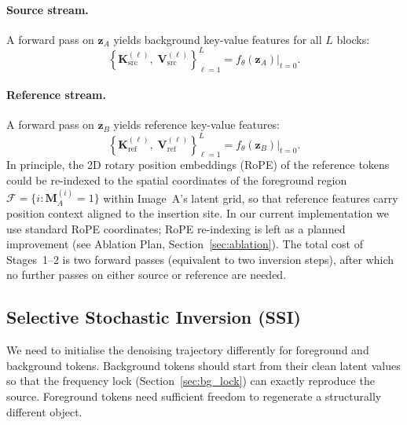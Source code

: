 \paragraph{Source stream.}
A forward pass on $\mathbf{z}_A$ yields background key-value features for all $L$ blocks:
\begin{equation}
    \left\{
        \mathbf{K}_{\mathrm{src}}^{(\ell)},\;
        \mathbf{V}_{\mathrm{src}}^{(\ell)}
    \right\}_{\ell=1}^{L}
    = f_\theta(\mathbf{z}_A)\big|_{t=0}.
    \label{eq:src_feat}
\end{equation}

\paragraph{Reference stream.}
A forward pass on $\mathbf{z}_B$ yields reference key-value features:
\begin{equation}
    \left\{
        \mathbf{K}_{\mathrm{ref}}^{(\ell)},\;
        \mathbf{V}_{\mathrm{ref}}^{(\ell)}
    \right\}_{\ell=1}^{L}
    = f_\theta(\mathbf{z}_B)\big|_{t=0}.
    \label{eq:ref_feat}
\end{equation}
In principle, the 2D rotary position embeddings (RoPE) of the reference tokens could be
re-indexed to the spatial coordinates of the foreground region
$\mathcal{F} = \{i : \mathbf{M}_A^{(i)} = 1\}$ within Image~A's latent grid, so that
reference features carry position context aligned to the insertion site.
In our current implementation we use standard RoPE coordinates; RoPE re-indexing is left
as a planned improvement (see Ablation Plan, Section~\ref{sec:ablation}).
The total cost of Stages~1--2 is two forward passes (equivalent to two inversion steps),
after which no further passes on either source or reference are needed.

\subsection{Selective Stochastic Inversion (SSI)}

We need to initialise the denoising trajectory differently for foreground and background
tokens.
Background tokens should start from their clean latent values so that the frequency lock
(Section~\ref{sec:bg_lock}) can exactly reproduce the source.
Foreground tokens need sufficient freedom to regenerate a structurally different object.


